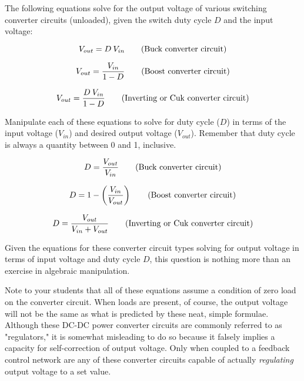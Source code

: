 

The following equations solve for the output voltage of various switching converter circuits (unloaded), given the switch duty cycle $D$ and the input voltage:

$$V_{out} = D \> V_{in}  \hbox{\hskip 20pt (Buck converter circuit)}$$

\vskip 10pt

$$V_{out} = {V_{in} \over {1 - D}}  \hbox{\hskip 20pt (Boost converter circuit)}$$

\vskip 10pt

$$V_{out} = {{D \> V_{in}} \over {1 - D}}  \hbox{\hskip 20pt (Inverting or Cuk converter circuit)}$$

Manipulate each of these equations to solve for duty cycle ($D$) in terms of the input voltage ($V_{in}$) and desired output voltage ($V_{out}$).  Remember that duty cycle is always a quantity between 0 and 1, inclusive.







$$D = {V_{out} \over V_{in}}  \hbox{\hskip 20pt (Buck converter circuit)}$$

\vskip 10pt

$$D = 1 - \left( {V_{in} \over V_{out}} \right)  \hbox{\hskip 20pt (Boost converter circuit)}$$

\vskip 10pt

$$D = {V_{out} \over {V_{in} + V_{out}}}  \hbox{\hskip 20pt (Inverting or Cuk converter circuit)}$$







Given the equations for these converter circuit types solving for output voltage in terms of input voltage and duty cycle $D$, this question is nothing more than an exercise in algebraic manipulation.

Note to your students that all of these equations assume a condition of zero load on the converter circuit.  When loads are present, of course, the output voltage will not be the same as what is predicted by these neat, simple formulae.  Although these DC-DC power converter circuits are commonly referred to as "regulators," it is somewhat misleading to do so because it falsely implies a capacity for self-correction of output voltage.  Only when coupled to a feedback control network are any of these converter circuits capable of actually {\it regulating} output voltage to a set value.




